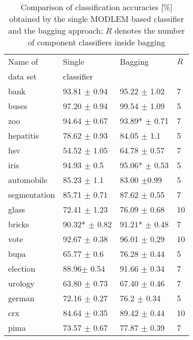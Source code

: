 \documentclass{llncs}
\begin{document}
\begin{table}
\label{tab:bag} \centering \caption{Comparison of classification accuracies
[\%] obtained by the single MODLEM based classifier and the bagging
approach; $R$ denotes the number of component classifiers inside bagging}
\setlength\tabcolsep{5pt}
\begin{tabular}{llll}
\hline\noalign{\smallskip} Name of &  Single & Bagging & $R $
\\ data set  & classifier &  &  \\ \noalign{\smallskip} \hline
\noalign{\smallskip}
bank & 93.81 \scriptsize{$\pm$}  0.94 &  95.22 \scriptsize{$\pm$} 1.02 & 7 \\
 buses & 97.20 \scriptsize{$\pm$ 0.94} &  99.54 \scriptsize{$\pm$ 1.09} & 5 \\
 zoo & 94.64 \scriptsize{$\pm$ 0.67}&  93.89* \scriptsize{$\pm$ 0.71} & 7 \\
 hepatitis & 78.62 \scriptsize{$\pm$ 0.93} & 84.05 \scriptsize{$\pm$ 1.1} & 5 \\
 hsv & 54.52 \scriptsize{$\pm$ 1.05} &  64.78 \scriptsize{$\pm$ 0.57} & 7\\
iris & 94.93 \scriptsize{$\pm$ 0.5} &  95.06* \scriptsize{$\pm$ 0.53} & 5 \\
automobile & 85.23 \scriptsize{$\pm$ 1.1} &  83.00 \scriptsize{$\pm 0.99$} &
5 \\ segmentation & 85.71 \scriptsize{$\pm$ 0.71} & 87.62 \scriptsize{$\pm$
0.55} & 7 \\ glass & 72.41 \scriptsize{$\pm$ 1.23} &  76.09
\scriptsize{$\pm$ 0.68} & 10 \\ bricks & 90.32* \scriptsize{$\pm$ 0.82} &
91.21* \scriptsize{$\pm$ 0.48} & 7 \\ vote & 92.67 \scriptsize{$\pm$ 0.38} &
96.01 \scriptsize{$\pm$ 0.29} & 10 \\ bupa & 65.77 \scriptsize{$\pm$ 0.6} &
76.28 \scriptsize{$\pm$ 0.44} & 5 \\ election & 88.96\scriptsize{$\pm$ 0.54}
&  91.66 \scriptsize{$\pm$ 0.34} & 7 \\ urology & 63.80 \scriptsize{$\pm$
0.73} &  67.40 \scriptsize{$\pm$ 0.46} & 7 \\ german & 72.16
\scriptsize{$\pm$ 0.27} &  76.2 \scriptsize{$\pm$ 0.34} & 5 \\ crx & 84.64
\scriptsize{$\pm$ 0.35} &  89.42 \scriptsize{$\pm$ 0.44} & 10\\ pima & 73.57
\scriptsize{$\pm$ 0.67} &  77.87 \scriptsize{$\pm$ 0.39} & 7\\
 \hline
\end{tabular}
\end{table}
\end{document}
